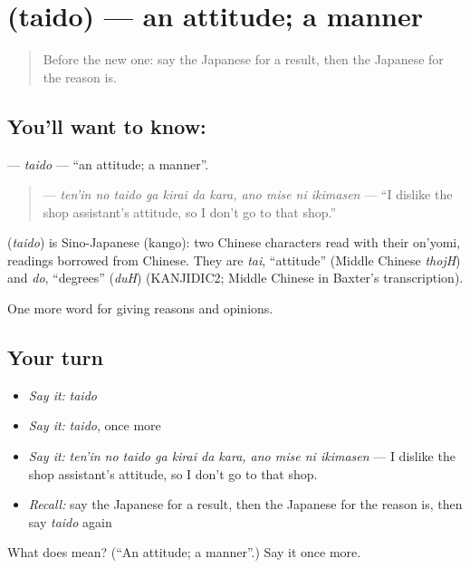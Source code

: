 \section[\texorpdfstring{\ja{たいど} (taido)}{たいど (taido)}]{ (taido) — an attitude; a manner}

\label{lesson:JA-C342-taido}



\begin{quote}
Before the new one: say the Japanese for a result, then the Japanese for the reason is.
\end{quote}

\subsection*{You'll want to know: }
\textbf{} — \emph{taido} — \textquotedblleft{}an attitude; a manner\textquotedblright{}.

\begin{quote}
\textbf{    } — \emph{ten'in no taido ga kirai da kara, ano mise ni ikimasen} — \textquotedblleft{}I dislike the shop assistant's attitude, so I don't go to that shop.\textquotedblright{}
\end{quote}

\begin{cousinweb}
\textbf{} (\emph{taido}) is Sino-Japanese (kango): two Chinese characters read with their on'yomi, readings borrowed from Chinese. They are \emph{tai}, \textquotedblleft{}attitude\textquotedblright{} (Middle Chinese \emph{thojH}) and \emph{do}, \textquotedblleft{}degrees\textquotedblright{} (\emph{duH}) (KANJIDIC2; Middle Chinese in Baxter's transcription).
\end{cousinweb}

\begin{grammarlens}[title={What you've built}]
One more word for giving reasons and opinions.
\end{grammarlens}

\subsection*{Your turn}
\begin{itemize}
\raggedright
  \item \emph{Say it:} \emph{taido}
  \item \emph{Say it:} \emph{taido}, once more
  \item \emph{Say it:} \emph{ten'in no taido ga kirai da kara, ano mise ni ikimasen} — I dislike the shop assistant's attitude, so I don't go to that shop.
  \item \emph{Recall:} say the Japanese for a result, then the Japanese for the reason is, then say \emph{taido} again
\end{itemize}

\begin{tcolorbox}[breakable,colback=teal!4,colframe=teal!35!black,title={Before you move on}]
What does  mean? (\textquotedblleft{}An attitude; a manner\textquotedblright{}.) Say it once more.
\end{tcolorbox}
